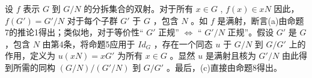 设 \(f\) 表示 \(G\) 到 \(G/N\) 的分拆集合的双射。对于所有 \(x \in G\) , \(f(x) \in xN\) 因此， \(f(G') = G'/N\) 对于每个子群 \(G'\) 于 \(G\) ，包含 \(N\) 。如 \(f\) 是满射，断言(a)由命题7的推论1得出；类似地，对于等价性“ \(G'\) 正规'' \(\Leftrightarrow\) `` \(G'/N\) 正规''。假设 \(G'\) 是 \(G\) ，包含 \(N\) 由第4条，将命题5应用于 \(Id_G\) ，存在一个同态 \(u\) 于 \(G/N\) 到 \(G/G'\) 上的作用，定义为 \(u(xN) = xG'\) 为所有 \(x \in G\) 。显然 \(u\) 是满射且核为 \(G'/N\) 由此得到所需的同构 \((G/N)/(G'/N)\) 到 \(G/G'\) 。最后，(c)直接由命题8得出。

